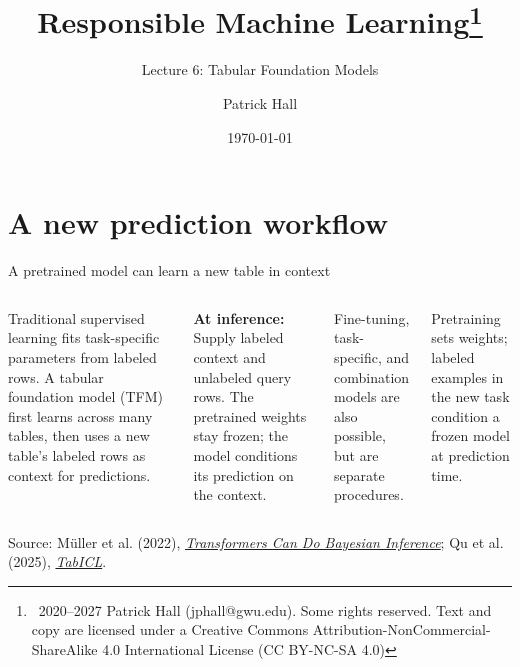 \documentclass[11pt,aspectratio=169,hyperref={colorlinks}]{beamer}
\title{Responsible Machine Learning\footnote{\tiny{\textcopyright\ 2020--2027 Patrick Hall (jphall@gwu.edu). Some rights reserved. Text and copy are licensed under a Creative Commons Attribution-NonCommercial-ShareAlike 4.0 International License (CC BY-NC-SA 4.0)}}}
\subtitle{Lecture 6: Tabular Foundation Models}
\author{Patrick Hall}
\institute{The George Washington University}
\date{\today}
\newcommand{\slidesource}[1]{\par\vfill\noindent\parbox{\linewidth}{\tiny\color{sourcegray}\raggedright\sloppy Source: #1.}}
\newcommand{\visualdescription}[1]{\par\vspace{.2em}\noindent\parbox{\linewidth}{\centering\tiny\color{sourcegray}#1}}
\begin{document}
\maketitle

\section{A new prediction workflow}
\begin{frame}{A pretrained model can learn a new table in context}
\small
\begin{columns}[c]
Traditional supervised learning fits task-specific parameters from labeled rows. A tabular foundation model (TFM) first learns across many tables, then uses a new table's labeled rows as context for predictions.
\begin{block}{\textbf{At inference:}}
Supply labeled context and unlabeled query rows. The pretrained weights stay frozen; the model conditions its prediction on the context.
\end{block}
Fine-tuning, task-specific, and combination models are also possible, but are separate procedures.
\centering
{}
\visualdescription{Pretraining sets weights; labeled examples in the new task condition a frozen model at prediction time.}
\end{columns}
\slidesource{Müller et al. (2022), \href{https://openreview.net/forum?id=KSugKcbNf9}{\emph{Transformers Can Do Bayesian Inference};} Qu et al. (2025), \href{https://proceedings.mlr.press/v267/qu25d.html}{\emph{TabICL}}}
\end{frame}
\end{document}
